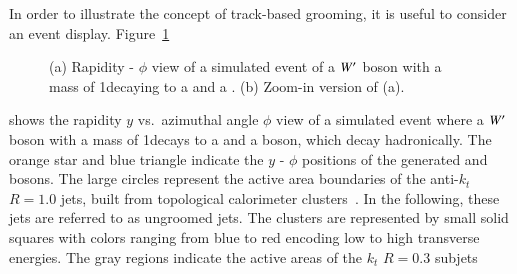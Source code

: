 \documentclass{atlasnote}
\begin{document}
In order to illustrate the concept of track-based grooming, it is useful to consider an event display. Figure~\ref{fig:EventDisp} 
\begin{figure}[!htbp]
  \centering
  \caption{(a) Rapidity - $\phi$ view of a simulated event of a $W^{\prime}$ boson with a mass of 1\TeV decaying to a \Wboson 
and a \Zboson. (b) Zoom-in version of (a).}
\label{fig:EventDisp}
\end{figure}
shows the rapidity $y$ vs.~azimuthal angle $\phi$ view of a simulated event where a $W^{\prime}$ boson with a mass of 1\TeV decays to a \Wboson and a \Zboson boson, 
which decay hadronically. The orange star and blue triangle indicate the $y$ - $\phi$ 
positions of the generated \Zboson and \Wboson bosons. The large circles represent the active area boundaries of 
the anti-$k_{t}$ $R=1.0$ jets, built from topological calorimeter clusters~\cite{Lampl:1099735}. 
In the following, these jets are referred to as ungroomed jets. The clusters are represented by small solid squares with colors ranging from blue to red encoding low to high transverse energies. 
The gray regions indicate the active areas of the $k_t$ $R=0.3$ subjets 
\end{document}
